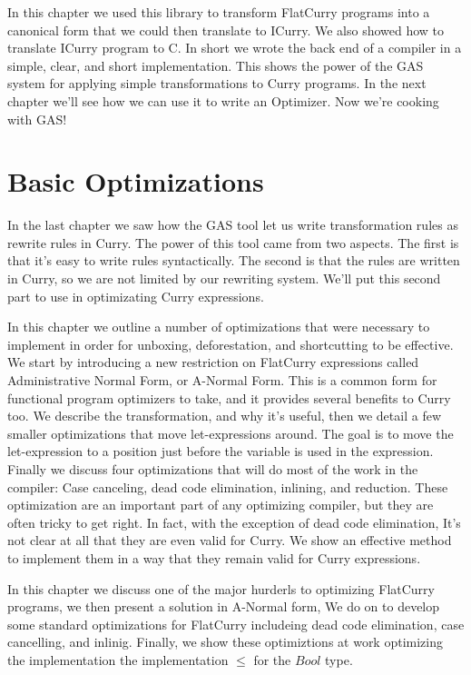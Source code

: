 \documentclass{book}
\theoremstyle{definition}
\newcommand{\Conid}[1]{\mathit{#1}}
\renewcommand{\leq}{\leqslant}
\begin{document}
In this chapter we used this library to transform FlatCurry programs into a canonical form that we could then
translate to ICurry.  We also showed how to translate ICurry program to C.
In short we wrote the back end of a compiler in a simple, clear, and short implementation.
This shows the power of the GAS system for applying simple transformations to Curry programs.
In the next chapter we'll see how we can use it to write an Optimizer.
Now we're cooking with GAS!

\chapter{Basic Optimizations} \label{ch:Basic Optimizations}


In the last chapter we saw how the GAS tool
let us write transformation rules as rewrite rules in Curry.
The power of this tool came from two aspects.
The first is that it's easy to write rules syntactically.
The second is that the rules are written in Curry,
so we are not limited by our rewriting system.
We'll put this second part to use in optimizating Curry expressions.

In this chapter we outline a number of optimizations that were necessary
to implement in order for unboxing, deforestation, and shortcutting to be effective.
We start by introducing a new restriction on FlatCurry expressions
called Administrative Normal Form, or A-Normal Form.
This is a common form for functional program optimizers to take,
and it provides several benefits to Curry too.
We describe the transformation, and why it's useful,
then we detail a few smaller optimizations that move let-expressions around.
The goal is to move the let-expression to a position just before the variable is used in the expression.
Finally we discuss four optimizations that will do most of the work in the compiler:
Case canceling, dead code elimination, inlining, and reduction.
These optimization are an important part of any optimizing compiler,
but they are often tricky to get right.
In fact, with the exception of dead code elimination, 
It's not clear at all that they are even valid for Curry.
We show an effective method to implement them
in a way that they remain valid for Curry expressions.

In this chapter we discuss one of the major hurderls to optimizing 
FlatCurry programs,
we then present a solution in A-Normal form,
We do on to develop some standard optimizations
for FlatCurry includeing dead code elimination, case cancelling, and inlinig.
Finally, we show these optimiztions at work optimizing the implementation
the implementation \ensuremath{\leq } for the \ensuremath{\Conid{Bool}} type.
\end{document}
